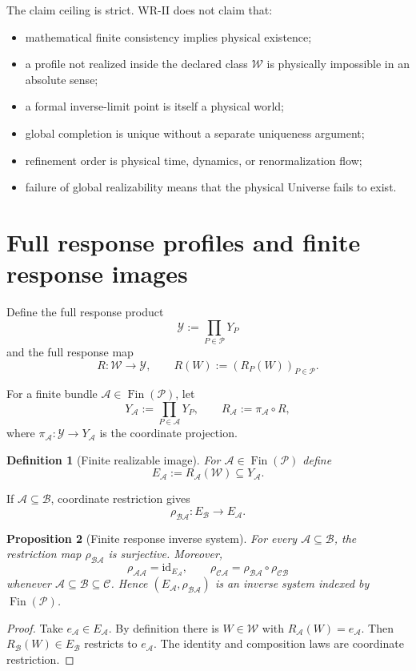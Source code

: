 \documentclass[11pt]{article}
\newtheorem{definition}{Definition}[section]
\newtheorem{proposition}[definition]{Proposition}
\newcommand{\W}{\mathcal W}
\newcommand{\Pcal}{\mathcal P}
\newcommand{\Acal}{\mathcal A}
\newcommand{\Bcal}{\mathcal B}
\newcommand{\Y}{\mathcal Y}
\newcommand{\Fin}{\operatorname{Fin}}
\begin{document}
The claim ceiling is strict. WR-II does not claim that:
\begin{itemize}
\item mathematical finite consistency implies physical existence;
\item a profile not realized inside the declared class $\W$ is physically
impossible in an absolute sense;
\item a formal inverse-limit point is itself a physical world;
\item global completion is unique without a separate uniqueness argument;
\item refinement order is physical time, dynamics, or renormalization flow;
\item failure of global realizability means that the physical Universe fails
to exist.
\end{itemize}

\section{Full response profiles and finite response images}

Define the full response product
\[
\Y:=\prod_{P\in\Pcal}Y_P
\]
and the full response map
\[
R:\W\to\Y,
\qquad
R(W):=(R_P(W))_{P\in\Pcal}.
\]

For a finite bundle $\Acal\in\Fin(\Pcal)$, let
\[
Y_{\Acal}:=\prod_{P\in\Acal}Y_P,
\qquad
R_{\Acal}:=\pi_{\Acal}\circ R,
\]
where $\pi_{\Acal}:\Y\to Y_{\Acal}$ is the coordinate projection.

\begin{definition}[Finite realizable image]
For $\Acal\in\Fin(\Pcal)$ define
\[
E_{\Acal}:=R_{\Acal}(\W)\subseteq Y_{\Acal}.
\]
\end{definition}

If $\Acal\subseteq\Bcal$, coordinate restriction gives
\[
\rho_{\Bcal\Acal}:E_{\Bcal}\to E_{\Acal}.
\]

\begin{proposition}[Finite response inverse system]\label{prop:inverse-system}
For every $\Acal\subseteq\Bcal$, the restriction map
$\rho_{\Bcal\Acal}$ is surjective. Moreover,
\[
\rho_{\Acal\Acal}=\mathrm{id}_{E_{\Acal}},
\qquad
\rho_{\mathcal C\Acal}
=
\rho_{\Bcal\Acal}\circ\rho_{\mathcal C\Bcal}
\]
whenever $\Acal\subseteq\Bcal\subseteq\mathcal C$.
Hence $(E_{\Acal},\rho_{\Bcal\Acal})$ is an inverse system indexed by
$\Fin(\Pcal)$.
\end{proposition}

\begin{proof}
Take $e_{\Acal}\in E_{\Acal}$. By definition there is $W\in\W$ with
$R_{\Acal}(W)=e_{\Acal}$. Then $R_{\Bcal}(W)\in E_{\Bcal}$ restricts to
$e_{\Acal}$. The identity and composition laws are coordinate restriction.
\end{proof}
\end{document}
